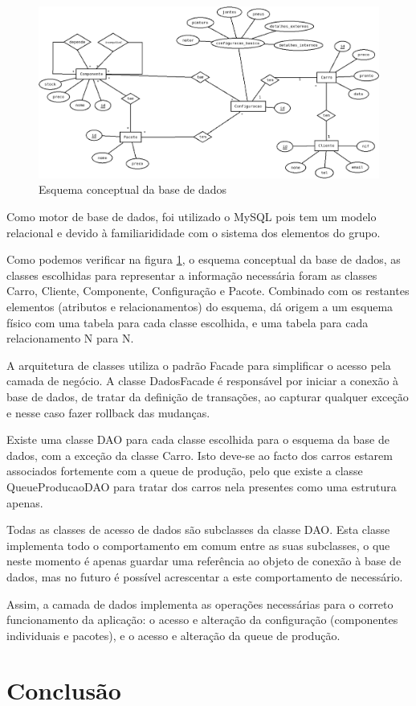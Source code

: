 \documentclass{llncs}
\begin{document}
\begin{figure}
\begin{center}
\includegraphics[scale=0.33]{esquema_conceptual.png}
\end{center}
\caption{\label{fig:esquema_conceptual}Esquema conceptual da base de dados}
\end{figure}

Como motor de base de dados, foi utilizado o MySQL pois tem um modelo relacional e devido à familiarididade com o sistema dos elementos do grupo.

Como podemos verificar na figura \ref{fig:esquema_conceptual}, o esquema conceptual da base de dados, as classes escolhidas para representar a informação necessária foram as classes Carro, Cliente, Componente, Configuração e Pacote. Combinado com os restantes elementos (atributos e relacionamentos) do esquema, dá origem a um esquema físico com uma tabela para cada classe escolhida, e uma tabela para cada relacionamento N para N.

A arquitetura de classes utiliza o padrão Facade para simplificar o acesso pela camada de negócio. A classe DadosFacade é responsável por iniciar a conexão à base de dados, de tratar da definição de transações, ao capturar qualquer exceção e nesse caso fazer rollback das mudanças.

Existe uma classe DAO para cada classe escolhida para o esquema da base de dados, com a exceção da classe Carro. Isto deve-se ao facto dos carros estarem associados fortemente com a queue de produção, pelo que existe a classe QueueProducaoDAO para tratar dos carros nela presentes como uma estrutura apenas.

Todas as classes de acesso de dados são subclasses da classe DAO. Esta classe implementa todo o comportamento em comum entre as suas subclasses, o que neste momento é apenas guardar uma referência ao objeto de conexão à base de dados, mas no futuro é possível acrescentar a este comportamento de necessário.

Assim, a camada de dados implementa as operações necessárias para o correto funcionamento da aplicação: o acesso e alteração da configuração (componentes individuais e pacotes), e o acesso e alteração da queue de produção.

\clearpage
\section{Conclusão}
\end{document}
